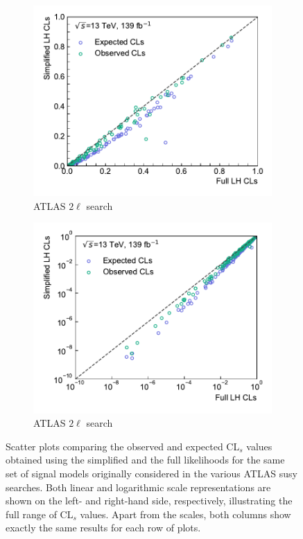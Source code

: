 \begin{figure}
\begin{subfigure}[b]{0.5\textwidth}
		\centering\includegraphics[width=\textwidth]{cls_scatter_2L0J_lin}
		\caption{ATLAS $2\ell$ search~\cite{SUSY-2018-32}}
	\end{subfigure}\hfill
	\begin{subfigure}[b]{0.5\textwidth}
		\centering\includegraphics[width=\textwidth]{cls_scatter_2L0J_log}
		\caption{ATLAS $2\ell$ search~\cite{SUSY-2018-32}}
	\end{subfigure}\hfill
	\caption{Scatter plots comparing the observed and expected CL$_s$ values obtained using the simplified and the full likelihoods for the same set of signal models originally considered in the various ATLAS \gls{susy} searches. Both linear and logarithmic scale representations are shown on the left- and right-hand side, respectively, illustrating the full range of CL$_s$ values. Apart from the scales, both columns show exactly the same results for each row of plots.}\label{fig:app_results_cls_1}
\end{figure}


